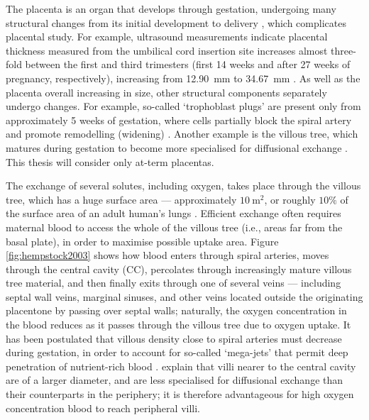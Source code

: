         The placenta is an organ that develops through gestation, undergoing many structural changes from its initial development to delivery \cite{clarkComputationalModelingInteractions2021}, which complicates placental study. For example, ultrasound measurements indicate placental thickness measured from the umbilical cord insertion site increases almost three-fold between the first and third trimesters (first 14 weeks and after 27 weeks of pregnancy, respectively), increasing from \qty{12.90}{\milli\metre} to \qty{34.67}{\milli\metre} \cite{banikPlacentalThicknessMeasurement2022}. As well as the placenta overall increasing in size, other structural components separately undergo changes. For example, so-called `trophoblast plugs' are present only from approximately 5 weeks of gestation, where cells partially block the spiral artery and promote remodelling (widening) \cite{jamesTrophoblastPlugsImpact2018}. Another example is the villous tree, which matures during gestation to become more specialised for diffusional exchange \cite{hempstockIntralobularDifferencesAntioxidant2003}. This thesis will consider only at-term placentas.

        The exchange of several solutes, including oxygen, takes place through the villous tree, which has a huge surface area  --- approximately $\qty{10}{\metre^2}$, or roughly $10\%$ of the surface area of an adult human's lungs \cite{clarkComplexitiesHumanPlacenta2023}. Efficient exchange often requires maternal blood to access the whole of the villous tree (i.e., areas far from the basal plate), in order to maximise possible uptake area. Figure \ref{fig:hempstock2003} shows how blood enters through spiral arteries, moves through the central cavity (CC), percolates through increasingly mature villous tree material, and then finally exits through one of several veins --- including septal wall veins, marginal sinuses, and other veins located outside the originating placentone by passing over septal walls; naturally, the oxygen concentration in the blood reduces as it passes through the villous tree due to oxygen uptake. It has been postulated that villous density close to spiral arteries must decrease during gestation, in order to account for so-called `mega-jets' that permit deep penetration of nutrient-rich blood \cite{saghianAssociationPlacentalJets2017}. \citeauthor{hempstockIntralobularDifferencesAntioxidant2003} \cite{hempstockIntralobularDifferencesAntioxidant2003} explain that villi nearer to the central cavity are of a larger diameter, and are less specialised for diffusional exchange than their counterparts in the periphery; it is therefore advantageous for high oxygen concentration blood to reach peripheral villi.

